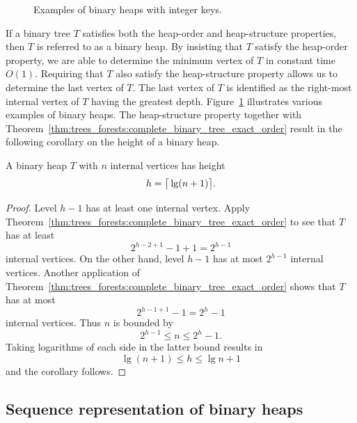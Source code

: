 \begin{figure}[!htbp]
\centering

\caption{Examples of binary heaps with integer keys.}
\label{fig:tree_data_structures:binary_heaps_integer_keys}
\end{figure}

If a binary tree $T$ satisfies both the heap-order and heap-structure
properties, then $T$ is referred to as a binary heap. By insisting
that $T$ satisfy the heap-order property,
we are able to determine the minimum vertex of $T$ in constant time
$O(1)$. Requiring that $T$ also satisfy the
heap-structure property allows us to
determine the last vertex of $T$. The last vertex of $T$ is identified
as the right-most internal vertex of $T$ having the greatest depth.
Figure~\ref{fig:tree_data_structures:binary_heaps_integer_keys}
illustrates various examples of binary heaps. The heap-structure
property together with
Theorem~\ref{thm:trees_forests:complete_binary_tree_exact_order}
result in the following corollary on the height of a binary heap.

\begin{corollary}
A binary heap $T$ with $n$ internal vertices has height
\[
h
=
\big\lceil \lg(n + 1) \big\rceil.\index{$\lg$}
\]
\end{corollary}

\begin{proof}
Level $h - 1$ has at least one internal vertex. Apply
Theorem~\ref{thm:trees_forests:complete_binary_tree_exact_order} to
see that $T$ has at least
\[
2^{h - 2 + 1} - 1 + 1
=
2^{h - 1}
\]
internal vertices. On the other hand, level $h - 1$ has at most
$2^{h-1}$ internal vertices. Another application of
Theorem~\ref{thm:trees_forests:complete_binary_tree_exact_order} shows
that $T$ has at most
\[
2^{h - 1 + 1} - 1
=
2^h - 1
\]
internal vertices. Thus $n$ is bounded by
\[
2^{h - 1} \leq n \leq 2^h - 1.
\]
Taking logarithms of each side in the latter bound results in
\[
\lg(n + 1) \leq h \leq \lg n + 1
\]
and the corollary follows.
\end{proof}



\subsection{Sequence representation of binary heaps}


